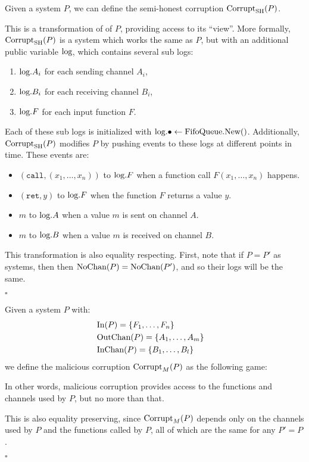 \begin{definition}
Given a system $P$, we can define
the semi-honest corruption $\text{Corrupt}_{\text{SH}}(P)$.

This is a transformation of
of $P$, providing access to its ``view''.
More formally, $\text{Corrupt}_{\text{SH}}(P)$ is a system which works the same
as $P$, but with an additional public variable $\text{log}$,
which contains several sub logs:
\begin{enumerate}
  \item $\text{log}.{A_i}$ for each sending channel $A_i$,
  \item $\text{log}.{B_i}$ for each receiving channel $B_i$,
  \item $\text{log}.F$ for each input function $F$.
\end{enumerate}
Each of these sub logs is initialized with ${\text{log}.\bullet \gets \text{FifoQueue.New()}}$.
Additionally, $\text{Corrupt}_{\text{SH}}(P)$ modifies $P$ by pushing events to these
logs at different points in time.
These events are:
\begin{itemize}
\item $(\texttt{call}, (x_1, \ldots, x_n))$ to $\text{log}.F$ when a function call $F(x_1, \ldots, x_n)$ happens.
\item $(\texttt{ret}, y)$ to $\text{log}.F$ when the function $F$ returns a value $y$.
\item $m$ to $\text{log}.A$ when a value $m$ is sent on channel $A$.
\item $m$ to $\text{log}.B$ when a value $m$ is received on channel $B$.
\end{itemize}

This transformation is also equality respecting.
First, note that if $P = P'$ as systems, then
then $\text{NoChan}(P) = \text{NoChan}(P')$, and so their logs will be the same.

$\square$
\end{definition}

\begin{definition}
Given a system $P$ with:
$$
\begin{aligned}
  &\text{In}(P) = \{F_1, \ldots, F_n\}\cr
  &\text{OutChan}(P) = \{A_1, \ldots, A_m\}\cr
  &\text{InChan}(P) = \{B_1, \ldots, B_l\}\cr
\end{aligned}
$$
we define the malicious corruption $\text{Corrupt}_M(P)$ as the following game:

In other words, malicious corruption provides access to the functions
and channels used by $P$, but no more than that.

This is also equality preserving, since $\text{Corrupt}_M(P)$ depends
only on the channels used by $P$ and the functions called by $P$,
all of which are the same for any $P' = P$.

$\square$
\end{definition}

